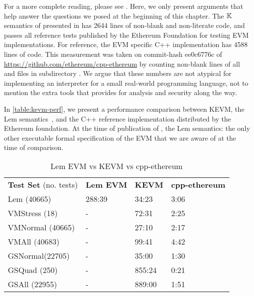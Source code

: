 For a more complete reading, please see
\cite{HildenbrandtCSF18}. Here, we only present arguments that
help answer the questions we posed at the beginning of this chapter.
The $\mathbb{K}{}$ semantics of \EVM{} presented in \cite{HildenbrandtCSF18}
has 2644 lines of non-blank and non-literate code, and passes
all reference tests published by the Ethereum Foundation for testing
EVM implementations. For reference,
the EVM specific C++ implementation has 4588 lines of code.
This measurement was taken on commit-hash ee0c6776c of
\url{https://github.com/ethereum/cpp-ethereum}
by counting non-blank lines of all  and  files
in subdirectory .
We argue that these numbers are not atypical for implementing an
interpreter for a small real-world programming language,
not to mention the extra tools that \K{} provides for analysis and security along the way.

In \autoref{table:kevm-perf}, we present a performance comparison between KEVM,
the Lem semantics~\cite{HiraiWSTC17},
and the C++ reference implementation distributed by the Ethereum foundation.
At the time of publication of \cite{HildenbrandtCSF18}, the Lem semantics:
the only other executable formal specification of the EVM that we are aware of
at the time of comparison.

\begin{table}[h]
    \centering
      \begin{tabular}{ l l l l }
          \textbf{Test Set} (no. tests) & \textbf{Lem EVM} & \textbf{KEVM} & \textbf{cpp-ethereum} \\
          Lem (40665)                   & 288:39           & 34:23         & 3:06                  \\
          VMStress (18)                 & -                & 72:31         & 2:25                  \\
          VMNormal (40665)              & -                & 27:10         & 2:17                  \\
          VMAll (40683)                 & -                & 99:41         & 4:42                  \\
          GSNormal(22705)               & -                & 35:00         & 1:30                  \\
          GSQuad (250)                  & -                & 855:24        & 0:21                  \\
          GSAll (22955)                 & -                & 889:00        & 1:51                  \\
      \end{tabular}
  \caption{Lem EVM vs KEVM vs cpp-ethereum} \label{table:kevm-perf}
\end{table}


